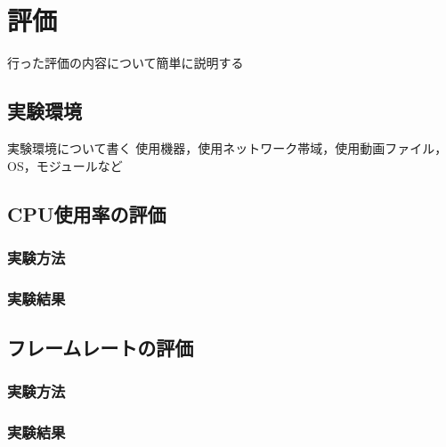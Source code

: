 \chapter{評価}
行った評価の内容について簡単に説明する

\section{実験環境}
実験環境について書く
使用機器，使用ネットワーク帯域，使用動画ファイル，OS，モジュールなど

\section{CPU使用率の評価}

\subsection{実験方法}

\subsection{実験結果}

\section{フレームレートの評価}

\subsection{実験方法}

\subsection{実験結果}